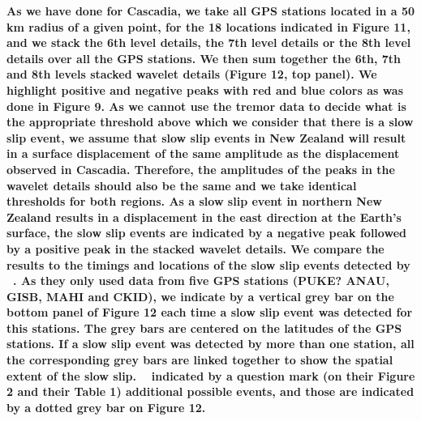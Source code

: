 \documentclass{article}
\begin{document}
\textbf{As we have done for Cascadia, we take all GPS stations located in a 50 km radius of a given point, for the 18 locations indicated in Figure 11, and we stack the 6th level details, the 7th level details or the 8th level details over all the GPS stations. We then sum together the 6th, 7th and 8th levels stacked wavelet details (Figure 12, top panel). We highlight positive and negative peaks with red and blue colors as was done in Figure 9. As we cannot use the tremor data to decide what is the appropriate threshold above which we consider that there is a slow slip event, we  assume that slow slip events in New Zealand will result in a surface displacement of the same amplitude as the displacement observed in Cascadia. Therefore, the amplitudes of the peaks in the wavelet details should also be the same and we take identical thresholds for both regions. As a slow slip event in northern New Zealand results in a displacement in the east direction at the Earth’s surface, the slow slip events are indicated by a negative peak followed by a positive peak in the stacked wavelet details. We compare the results to the timings and locations of the slow slip events detected by ~\citet{TOD_2016}. As they only used data from five GPS stations (PUKE? ANAU, GISB, MAHI and CKID), we indicate by a vertical grey bar on the bottom panel of Figure 12 each time a slow slip event was detected for this stations. The grey bars are centered on the latitudes of the GPS stations. If a slow slip event was detected by more than one station, all the corresponding grey bars are linked together to show the spatial extent of the slow slip. ~\citet{TOD_2016} indicated by a question mark (on their Figure 2 and their Table 1) additional possible events, and those are indicated by a dotted grey bar on Figure 12.} \\
\end{document}
